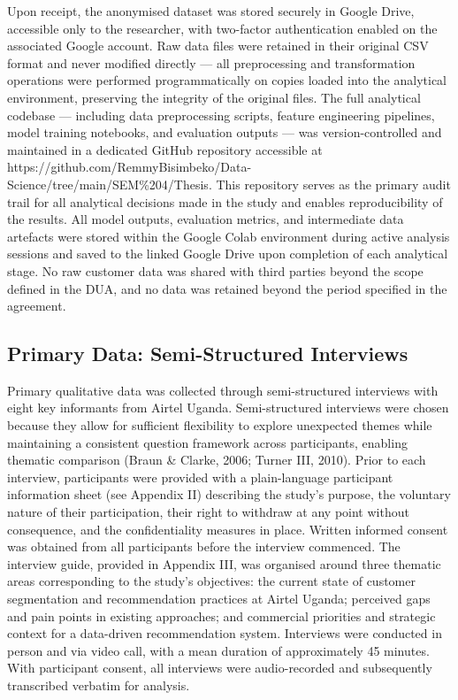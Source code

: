 Upon receipt, the anonymised dataset was stored securely in Google Drive, accessible only to the researcher, with two-factor authentication enabled on the associated Google account. Raw data files were retained in their original CSV format and never modified directly --- all preprocessing and transformation operations were performed programmatically on copies loaded into the analytical environment, preserving the integrity of the original files. The full analytical codebase --- including data preprocessing scripts, feature engineering pipelines, model training notebooks, and evaluation outputs --- was version-controlled and maintained in a dedicated GitHub repository accessible at https://github.com/RemmyBisimbeko/Data-Science/tree/main/SEM\%204/Thesis. This repository serves as the primary audit trail for all analytical decisions made in the study and enables reproducibility of the results. All model outputs, evaluation metrics, and intermediate data artefacts were stored within the Google Colab environment during active analysis sessions and saved to the linked Google Drive upon completion of each analytical stage. No raw customer data was shared with third parties beyond the scope defined in the DUA, and no data was retained beyond the period specified in the agreement.


\subsection{Primary Data: Semi-Structured Interviews}

Primary qualitative data was collected through semi-structured interviews with eight key informants from Airtel Uganda. Semi-structured interviews were chosen because they allow for sufficient flexibility to explore unexpected themes while maintaining a consistent question framework across participants, enabling thematic comparison (Braun \& Clarke, 2006; Turner III, 2010). Prior to each interview, participants were provided with a plain-language participant information sheet (see Appendix II) describing the study's purpose, the voluntary nature of their participation, their right to withdraw at any point without consequence, and the confidentiality measures in place. Written informed consent was obtained from all participants before the interview commenced. The interview guide, provided in Appendix III, was organised around three thematic areas corresponding to the study's objectives: the current state of customer segmentation and recommendation practices at Airtel Uganda; perceived gaps and pain points in existing approaches; and commercial priorities and strategic context for a data-driven recommendation system. Interviews were conducted in person and via video call, with a mean duration of approximately 45 minutes. With participant consent, all interviews were audio-recorded and subsequently transcribed verbatim for analysis.


